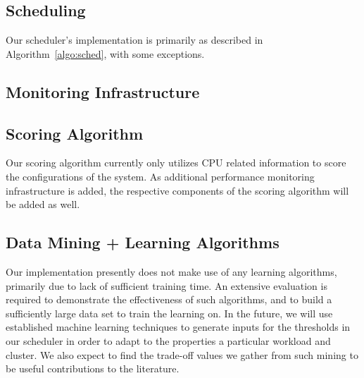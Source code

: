 \subsection{Scheduling}


Our scheduler's implementation is primarily as described in
Algorithm~\ref{algo:sched}, with some exceptions.

\subsection{Monitoring Infrastructure}


\subsection{Scoring Algorithm}

Our scoring algorithm currently only utilizes CPU related information to score the configurations of the system.  As additional performance monitoring infrastructure is added, the respective components of the scoring algorithm will be added as well.

\subsection{Data Mining + Learning Algorithms}

Our implementation presently does not make use of any learning algorithms,
primarily due to lack of sufficient training time.  An extensive evaluation is required
to demonstrate the effectiveness of such algorithms, and to build a sufficiently
large data set to train the learning on.  In the future, we will use established
machine learning techniques to generate inputs for the thresholds in our
scheduler in order to adapt to the properties a particular workload and cluster.
We also expect to find the trade-off values we gather from such mining to be
useful contributions to the literature.

